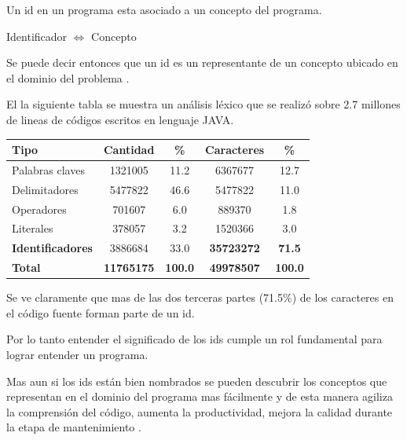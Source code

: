\documentclass[12pt]{report}
\begin{document}
Un id en un programa esta asociado a un concepto del programa. 

\begin{center}
\textsf{Identificador $\Leftrightarrow$ Concepto}
\end{center}

Se puede decir entonces que un id es un representante de un concepto ubicado en el dominio del problema \cite{DFPM05}.

El la siguiente tabla se muestra un análisis léxico que se realizó sobre 2.7 millones de lineas de códigos escritos en lenguaje JAVA\texttrademark \cite{DFPM05}.\\%

\begin{center}
   \begin{tabular}{| l | c | c | c | c | }
     \hline
     \textsf{Tipo} & \textsf{Cantidad} & \textsf{\%} & \textsf{Caracteres} & \textsf{\%} \\ \hline
     Palabras claves & 1321005 & 11.2 & 6367677 & 12.7 \\ \hline
     Delimitadores & 5477822 & 46.6 & 5477822 & 11.0 \\ \hline
     Operadores & 701607 & 6.0 & 889370 & 1.8 \\ \hline
     Literales & 378057 & 3.2 & 1520366 & 3.0 \\ \hline          
     \textbf{Identificadores} & 3886684 & 33.0 & \textbf{35723272} & \textbf{71.5} \\ \hline
     \textbf{Total} & \textbf{11765175} & \textbf{100.0} & \textbf{49978507} & \textbf{100.0} \\ \hline          
   \end{tabular}
\end{center}

Se ve claramente que mas de las dos terceras partes (71.5\%) de los caracteres en el código fuente forman parte de un id. 

Por lo tanto entender el significado de los ids cumple un rol fundamental para lograr entender un programa. 

Mas aun si los ids están bien nombrados se pueden descubrir los conceptos que representan en el dominio del programa mas fácilmente y de esta manera agiliza la comprensión del código, aumenta la productividad, mejora la calidad durante la etapa de mantenimiento \cite{DFPM05}. 

\end{document}
